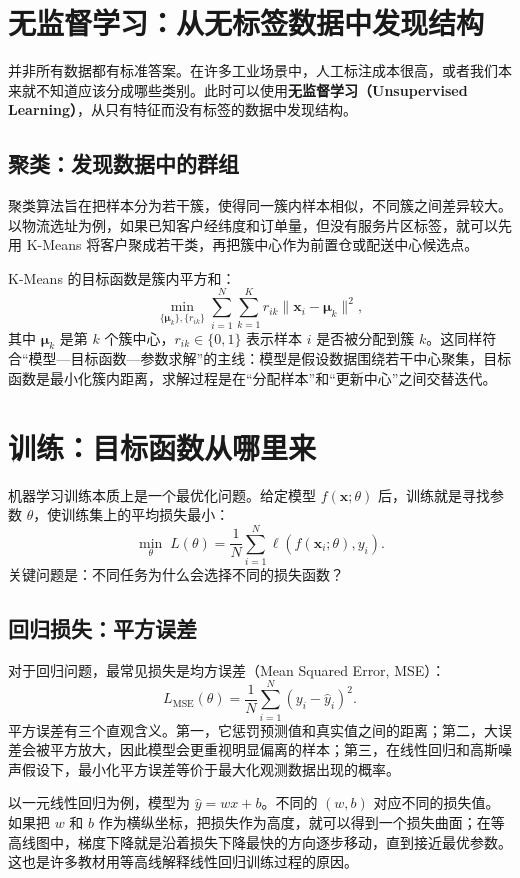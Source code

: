 \section{无监督学习：从无标签数据中发现结构}

并非所有数据都有标准答案。在许多工业场景中，人工标注成本很高，或者我们本来就不知道应该分成哪些类别。此时可以使用\textbf{无监督学习（Unsupervised Learning）}，从只有特征而没有标签的数据中发现结构。

\subsection{聚类：发现数据中的群组}

聚类算法旨在把样本分为若干簇，使得同一簇内样本相似，不同簇之间差异较大。以物流选址为例，如果已知客户经纬度和订单量，但没有服务片区标签，就可以先用 K-Means 将客户聚成若干类，再把簇中心作为前置仓或配送中心候选点。

K-Means 的目标函数是簇内平方和：
\[
\min_{\{\boldsymbol{\mu}_k\},\{r_{ik}\}}
\sum_{i=1}^{N}\sum_{k=1}^{K}r_{ik}\|\mathbf{x}_i-\boldsymbol{\mu}_k\|^2,
\]
其中 $\boldsymbol{\mu}_k$ 是第 $k$ 个簇中心，$r_{ik}\in\{0,1\}$ 表示样本 $i$ 是否被分配到簇 $k$。这同样符合“模型—目标函数—参数求解”的主线：模型是假设数据围绕若干中心聚集，目标函数是最小化簇内距离，求解过程是在“分配样本”和“更新中心”之间交替迭代。

\section{训练：目标函数从哪里来}

机器学习训练本质上是一个最优化问题。给定模型 $f(\mathbf{x};\theta)$ 后，训练就是寻找参数 $\theta$，使训练集上的平均损失最小：
\[
\min_{\theta}\; L(\theta)=\frac{1}{N}\sum_{i=1}^{N}\ell(f(\mathbf{x}_i;\theta),y_i).
\]
关键问题是：不同任务为什么会选择不同的损失函数？

\subsection{回归损失：平方误差}

对于回归问题，最常见损失是均方误差（Mean Squared Error, MSE）：
\[
L_{\mathrm{MSE}}(\theta)=\frac{1}{N}\sum_{i=1}^{N}(y_i-\hat{y}_i)^2.
\]
平方误差有三个直观含义。第一，它惩罚预测值和真实值之间的距离；第二，大误差会被平方放大，因此模型会更重视明显偏离的样本；第三，在线性回归和高斯噪声假设下，最小化平方误差等价于最大化观测数据出现的概率。

以一元线性回归为例，模型为 $\hat{y}=wx+b$。不同的 $(w,b)$ 对应不同的损失值。如果把 $w$ 和 $b$ 作为横纵坐标，把损失作为高度，就可以得到一个损失曲面；在等高线图中，梯度下降就是沿着损失下降最快的方向逐步移动，直到接近最优参数。这也是许多教材用等高线解释线性回归训练过程的原因。

